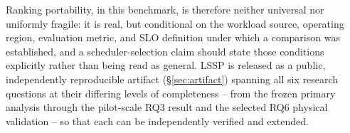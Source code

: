 Ranking portability, in this benchmark, is therefore neither universal nor
uniformly fragile: it is real, but conditional on the workload source,
operating region, evaluation metric, and SLO definition under which a
comparison was established, and a scheduler-selection claim should state
those conditions explicitly rather than being read as general. LSSP is
released as a public, independently reproducible artifact
(\S\ref{sec:artifact}) spanning all six research questions at their
differing levels of completeness -- from the frozen primary analysis
through the pilot-scale RQ3 result and the selected RQ6 physical
validation -- so that each can be independently verified and extended.
